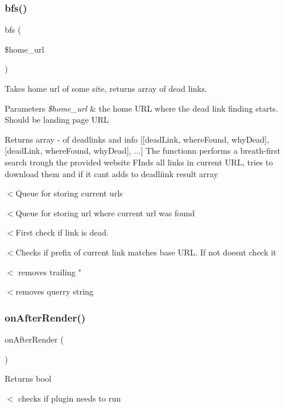 \subsubsection{\texorpdfstring{bfs()}{bfs()}}
{\footnotesize\ttfamily bfs (\begin{DoxyParamCaption}\item[{}]{\$home\+\_\+url }\end{DoxyParamCaption})}



Takes home url of some site, returns array of dead links. 


\begin{DoxyParams}{Parameters}
{\em \$home\+\_\+url} & the home U\+RL where the dead link finding starts. Should be landing page U\+RL \\
\hline
\end{DoxyParams}
\begin{DoxyReturn}{Returns}
array -\/ of deadlinks and info \mbox{[}\mbox{[}dead\+Link, where\+Found, why\+Dead\mbox{]}, \mbox{[}dead\+Link, where\+Found, why\+Dead\mbox{]}, ...\mbox{]} The functionn performs a breath-\/first search trough the provided website F\+Inds all links in current U\+RL, tries to download them and if it can\textquotesingle{}t adds to deadliink result array 
\end{DoxyReturn}
$<$Queue for storing current urls

$<$Queue for storing url where current url was found

$<$First check if link is dead.

$<$Checks if prefix of current link matches base U\+RL. If not doesn\textquotesingle{}t check it

$<$ removes trailing "

$<$removes querry string \mbox{\label{classplg_system_cupdater_a2dd6ef9761d5b07ec08554b6042d1263}} 
\subsubsection{\texorpdfstring{onAfterRender()}{onAfterRender()}}
{\footnotesize\ttfamily on\+After\+Render (\begin{DoxyParamCaption}{ }\end{DoxyParamCaption})}

\begin{DoxyReturn}{Returns}
bool 
\end{DoxyReturn}
$<$ checks if plugin needs to run \mbox{\label{classplg_system_cupdater_a4e4cea4d20ee382d37b15301ce67d5cb}} 
